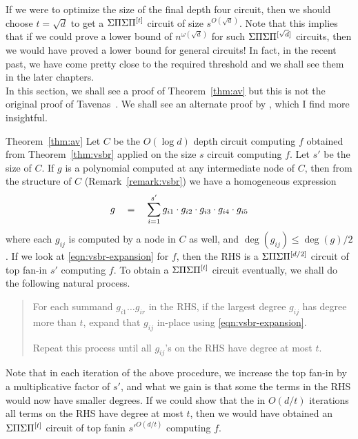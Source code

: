 If we were to optimize the size of the final depth four circuit, then we should choose $t = \sqrt{d}$ to get a $\Sigma\Pi\Sigma\Pi^{[t]}$ circuit of size $s^{O(\sqrt{d})}$. Note that this implies that if we could prove a lower bound of $n^{\omega(\sqrt{d})}$ for such $\Sigma\Pi\Sigma\Pi^{[\sqrt{d}]}$ circuits, then we would have proved a lower bound for general circuits! In fact, in the recent past, we have come pretty close to the required threshold and we shall see them in the later chapters. \\

In this section, we shall see a proof of Theorem~\ref{thm:av} but this is not the original proof of Tavenas~\cite{Tav13}. We shall see an alternate proof by \cite{saptharishivinay14}, which I find more insightful. 

\begin{proofof}{Theorem~\ref{thm:av}}
Let $C$ be the $O(\log d)$ depth  circuit computing $f$ obtained from Theorem~\ref{thm:vsbr} applied on the size $s$ circuit computing $f$. Let $s'$ be the size of $C$. If $g$ is a polynomial computed at any intermediate node of $C$, then from the structure of $C$ (Remark~\ref{remark:vsbr}) we have a homogeneous expression
\begin{equation}\label{eqn:vsbr-expansion}
g \quad = \quad \sum_{i=1}^{s'} g_{i1} \cdot g_{i2} \cdot g_{i3} \cdot g_{i4} \cdot g_{i5} 
\end{equation}
where each $g_{ij}$ is computed by a node in $C$ as well, and $\deg(g_{ij}) \leq \deg(g)/2$. If we look at \eqref{eqn:vsbr-expansion} for $f$, then the RHS is a $\Sigma\Pi\Sigma\Pi^{[d/2]}$ circuit of top fan-in $s'$ computing $f$. To obtain a $\Sigma\Pi\Sigma\Pi^{[t]}$ circuit eventually, we shall do the following natural process. 
\begin{quote}
  For each summand $g_{i1}\dots g_{ir}$ in the RHS, if the largest degree $g_{ij}$ has degree more than $t$, expand that $g_{ij}$ in-place using \eqref{eqn:vsbr-expansion}. 
  
  Repeat this process until all $g_{ij}$'s on the RHS have degree at most $t$. 
\end{quote}

Note that in each iteration of the above procedure, we increase the top fan-in by a multiplicative factor of $s'$, and what we gain is that some the terms in the RHS would now have smaller degrees. If we could show that the in $O(d/t)$  iterations  all terms on the RHS have degree at most $t$, then we would have obtained an $\Sigma\Pi\Sigma\Pi^{[t]}$ circuit of top fanin $s'^{O(d/t)}$ computing $f$. \\


\end{proofof}

